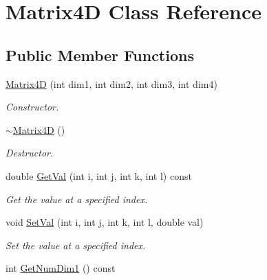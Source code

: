 \hypertarget{classMatrix4D}{
\section{Matrix4D Class Reference}
\label{d7/d9c/classMatrix4D}
}
\subsection*{Public Member Functions}
\begin{DoxyCompactItemize}
\item 
\hypertarget{classMatrix4D_ac4ef4cb38ec681c8ae057081aa1235ef}{
\hyperlink{classMatrix4D_ac4ef4cb38ec681c8ae057081aa1235ef}{Matrix4D} (int dim1, int dim2, int dim3, int dim4)}
\label{d7/d9c/classMatrix4D_ac4ef4cb38ec681c8ae057081aa1235ef}

\begin{DoxyCompactList}\small\item\em Constructor. \item\end{DoxyCompactList}\item 
\hypertarget{classMatrix4D_a90b64981f087dfcb496b8f5a0449803c}{
\hyperlink{classMatrix4D_a90b64981f087dfcb496b8f5a0449803c}{$\sim$Matrix4D} ()}
\label{d7/d9c/classMatrix4D_a90b64981f087dfcb496b8f5a0449803c}

\begin{DoxyCompactList}\small\item\em Destructor. \item\end{DoxyCompactList}\item 
\hypertarget{classMatrix4D_a03f55155ae67a6741a662494ac7da18a}{
double \hyperlink{classMatrix4D_a03f55155ae67a6741a662494ac7da18a}{GetVal} (int i, int j, int k, int l) const }
\label{d7/d9c/classMatrix4D_a03f55155ae67a6741a662494ac7da18a}

\begin{DoxyCompactList}\small\item\em Get the value at a specified index. \item\end{DoxyCompactList}\item 
\hypertarget{classMatrix4D_a113ab746b94d6c253823f53cae3b8181}{
void \hyperlink{classMatrix4D_a113ab746b94d6c253823f53cae3b8181}{SetVal} (int i, int j, int k, int l, double val)}
\label{d7/d9c/classMatrix4D_a113ab746b94d6c253823f53cae3b8181}

\begin{DoxyCompactList}\small\item\em Set the value at a specified index. \item\end{DoxyCompactList}\item 
\hypertarget{classMatrix4D_a7582cae941bf64578b9099ad91afc869}{
int \hyperlink{classMatrix4D_a7582cae941bf64578b9099ad91afc869}{GetNumDim1} () const }
\label{d7/d9c/classMatrix4D_a7582cae941bf64578b9099ad91afc869}


\end{DoxyCompactItemize}
